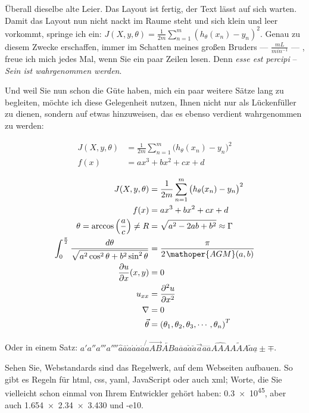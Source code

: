 Überall dieselbe alte Leier. Das Layout ist fertig, der Text lässt
auf sich warten. Damit das Layout nun nicht nackt im Raume steht und
sich klein und leer vorkommt, springe ich ein:
\(J(X, y, \theta) = \frac{1}{2m}\sum_{n=1}^m{(h_{\theta}(x_{n})-y_{n})^2}\).
Genau zu diesem Zwecke erschaffen, immer im Schatten meines großen
Bruders --- \(\frac{mL}{min^{-1}}\) --- , freue ich mich jedes Mal,
wenn Sie ein paar Zeilen lesen. Denn \emph{esse est percipi} --
\emph{Sein ist wahrgenommen werden}.

Und weil Sie nun schon die Güte haben, mich ein paar weitere Sätze
lang zu begleiten, möchte ich diese Gelegenheit nutzen, Ihnen nicht
nur als Lückenfüller zu dienen, sondern auf etwas hinzuweisen, das
es ebenso verdient wahrgenommen zu werden:

\begin{equation}
\begin{aligned}
  J(X, y, \theta) &= \frac{1}{2m}\sum_{n=1}^m{\big(h_{\theta}(x_{n})-y_{n}\big)^2} \\
  f(x) &= ax^3 + bx^2 + cx + d
\end{aligned}
\end{equation}

\begin{align}
  J(X, y, \theta) &= \frac{1}{2m}\sum_{n=1}^m{\big(h_{\theta}(x_{n})-y_{n}\big)^2} \\
  f(x) &= ax^3 + bx^2 + cx + d \\
    \theta = \arccos \left(\frac{a}{c}\right) \neq R &= \sqrt{ a^2 - 2ab + b^2 } \approx \Gamma \\
    \int_0^{\frac{\pi}{2}} \frac{ d \theta}{\sqrt{a^2\cos^2\theta +b^2 \sin^2\theta }} &= \frac{\pi}{2\kern1pt\mathoper{AGM}(a,b)} \\
    \frac{\partial u}{\partial x}(x, y) &= 0 \\
    u_{xx} &= \frac{\partial^2 u}{\partial x^2} \\
    \nabla &= 0 \\
    \vec{\theta} &= \left(\theta_1, \theta_2, \theta_3, \cdots, \theta_n\right)^T
\end{align}

Oder in einem Satz:
\(a' a'' a''' a'''' \hat{a} \bar{a} \grave{a} \acute{a} \dot{a} \ddot{a} \not{a} \overrightarrow{AB} \overleftarrow{AB} \overline{aaa} \check{a} \breve{a} \vec{a} \dddot{a} \ddddot{a} \widehat{AAA} \widetilde{AAA} \tilde{a} \underline{a} \pm \mp\).

Sehen Sie, Webstandards sind das Regelwerk, auf dem Webseiten
aufbauen. So gibt es Regeln für \gls{html}, \gls{css}, \gls{yaml},
JavaScript oder auch \gls{xml}; Worte, die Sie vielleicht schon
einmal von Ihrem Entwickler gehört haben: \num{.3e45}, aber auch
\num{1.654 x 2.34 x 3.430} und \num{-e10}.

